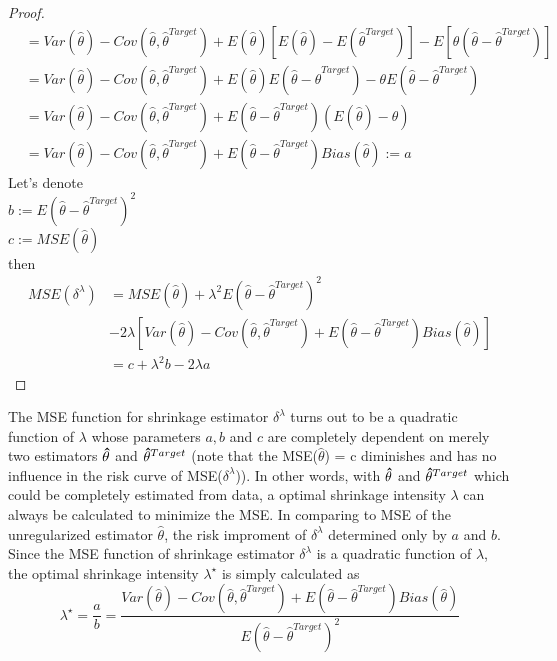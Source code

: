 \begin{proof}
\begin{align*}
	& = Var(\hat \theta) - Cov(\hat \theta, \hat \theta^{Target}) + E(\hat \theta)[E(\hat \theta) - E(\hat \theta^{Target})] - E[ \theta(\hat \theta - \hat \theta^{Target}) ]\\
	& = Var(\hat \theta) - Cov(\hat \theta, \hat \theta^{Target}) + E(\hat \theta)E(\hat \theta - \hat \theta^{Target}) - \theta E(\hat \theta - \hat \theta^{Target})\\
	& = Var(\hat \theta) - Cov(\hat \theta, \hat \theta^{Target}) + E(\hat \theta - \hat \theta^{Target})(E(\hat \theta) - \theta)\\
	& = Var(\hat \theta) - Cov(\hat \theta, \hat \theta^{Target}) + E(\hat \theta - \hat \theta^{Target})Bias(\hat \theta) := a
\end{align*}
Let's denote \\
$b := E(\hat \theta - {\hat \theta}^{Target})^2$\\
$c := MSE(\hat \theta)$\\
then 
\begin{align*}
	MSE(\delta^{\lambda}) & = MSE(\hat \theta) + \lambda^2 E(\hat \theta - {\hat \theta}^{Target})^2 \\
	& - 2\lambda [Var(\hat \theta) - Cov(\hat \theta, \hat \theta^{Target}) + E(\hat \theta - \hat \theta^{Target})Bias(\hat \theta)] \\
	& = c + \lambda^2 b - 2\lambda a
\end{align*}
\end{proof}
The MSE function for shrinkage estimator $\delta^{\lambda}$ turns out to be a quadratic function of $\lambda$ whose parameters $a, b$ and $c$ are completely dependent on merely two estimators ${\bf \hat \theta}$ and ${\bf \hat \theta}^{Target}$ (note that the MSE($\hat \theta$) = c diminishes and has no influence in the risk curve of MSE($\delta^{\lambda}$)). In other words, with ${\bf \hat \theta}$ and ${\bf \hat \theta}^{Target}$ which could be completely estimated from data, a optimal shrinkage intensity $\lambda$ can always be calculated to minimize the MSE. In comparing to MSE of the unregularized estimator $\hat \theta$, the risk improment of $\delta^{\lambda}$ determined only by $a$ and $b$. Since the MSE function of shrinkage estimator $\delta^{\lambda}$ is a quadratic function of $\lambda$, the optimal shrinkage intensity $\lambda^\star$ is simply calculated as
\begin{equation} \label{eq:lambda}
	\lambda^\star = \frac{a}{b} = \frac{Var(\hat \theta) - Cov(\hat \theta, \hat \theta^{Target}) + E(\hat \theta - \hat \theta^{Target})Bias(\hat \theta)}{E(\hat \theta - {\hat \theta}^{Target})^2}
\end{equation}

